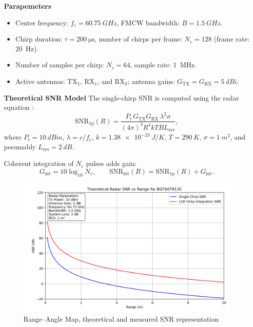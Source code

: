 \noindent
\textbf{Parapemeters}
\begin{itemize}
    \item Center frequency: \(f_c = \SI{60.75}{GHz}\), FMCW bandwidth: \(B = \SI{1.5}{GHz}\).
    \item Chirp duration: \(\tau = \SI{200}{\micro\second}\), number of chirps per frame: \(N_c = 128\) (frame rate: \SI{20}{Hz}).
    \item Number of samples per chirp: \(N_s = 64\), sample rate: \SI{1}{MHz}.
    \item Active antennas: \(\text{TX}_1\), \(\text{RX}_1\), and \(\text{RX}_3\); antenna gains: \(G_\text{TX} = G_\text{RX} = \SI{5}{dBi}\).
\end{itemize}
\noindent
\textbf{Theoretical SNR Model}
\noindent
The single-chirp SNR is computed using the radar equation \citep{Skolnik2001}:
\begin{equation}
	\label{eq:snr_theor_single}
	\text{SNR}_{\text{1p}}(R)=
	\frac{P_t\,G_\text{TX}G_\text{RX}\,\lambda^{2}\sigma}
	     {(4\pi)^{3} R^{4} k T  B  L_\text{sys}},
\end{equation}
where \(P_t = \SI{10}{dBm}\), \(\lambda = c / f_c\),
\(k = \SI{1.38e-23}{J/K}\), \(T = \SI{290}{K}\),
\(\sigma = \SI{1}{m^{2}}\), and pesumably \(L_\text{sys} = \SI{2}{dB}\).

\noindent
Coherent integration of \(N_c\) pulses adds gain:
\begin{equation}
	G_\text{int}=10\log_{10} N_c,
\qquad
	\text{SNR}_{\text{int}}(R)=\text{SNR}_{\text{1p}}(R)+G_\text{int}.
\end{equation}
\noindent




\begin{figure}[H]
    \centering
    \includegraphics[width=0.7\linewidth]{Src//images/TheoreticalSNR.png}
    \caption{Range–Angle Map, theoretical and measured SNR representation}
    \label{fig:exp4_gui}
\end{figure}



